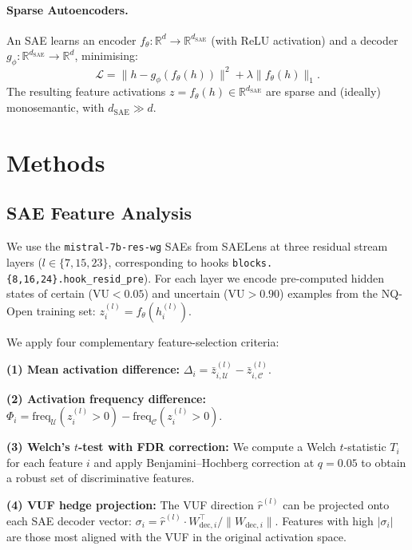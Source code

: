 \documentclass{article}
\newcommand{\VU}{\mathrm{VU}}
\begin{document}
\paragraph{Sparse Autoencoders.}
An SAE learns an encoder $f_\theta: \mathbb{R}^d \to \mathbb{R}^{d_{\mathrm{SAE}}}$
(with ReLU activation) and a decoder $g_\phi: \mathbb{R}^{d_{\mathrm{SAE}}} \to
\mathbb{R}^d$, minimising:
\begin{equation}
  \mathcal{L} = \|h - g_\phi(f_\theta(h))\|^2 + \lambda \|f_\theta(h)\|_1.
  \label{eq:sae}
\end{equation}
The resulting feature activations $z = f_\theta(h) \in \mathbb{R}^{d_{\mathrm{SAE}}}$
are sparse and (ideally) monosemantic, with $d_{\mathrm{SAE}} \gg d$.

\section{Methods}
\label{sec:methods}

\subsection{SAE Feature Analysis}

We use the \texttt{mistral-7b-res-wg} SAEs from SAELens at three residual
stream layers ($l \in \{7, 15, 23\}$, corresponding to hooks
\texttt{blocks.\{8,16,24\}.hook\_resid\_pre}).  For each layer we encode
pre-computed hidden states of certain ($\VU < 0.05$) and uncertain
($\VU > 0.90$) examples from the NQ-Open training set:
$z^{(l)}_i = f_\theta(h^{(l)}_i)$.

We apply four complementary feature-selection criteria:

\textbf{(1) Mean activation difference:} $\Delta_i = \bar{z}^{(l)}_{i,\mathcal{U}} - \bar{z}^{(l)}_{i,\mathcal{C}}$.

\textbf{(2) Activation frequency difference:} $\Phi_i = \mathrm{freq}_{\mathcal{U}}(z^{(l)}_i > 0) - \mathrm{freq}_{\mathcal{C}}(z^{(l)}_i > 0)$.

\textbf{(3) Welch's $t$-test with FDR correction:} We compute a Welch $t$-statistic
$T_i$ for each feature $i$ and apply Benjamini--Hochberg correction at $q = 0.05$
to obtain a robust set of discriminative features.

\textbf{(4) VUF hedge projection:} The VUF direction $\hat{r}^{(l)}$ can be
projected onto each SAE decoder vector:
$\sigma_i = \hat{r}^{(l)} \cdot W_{\mathrm{dec},i}^{\top} / \|W_{\mathrm{dec},i}\|$.
Features with high $|\sigma_i|$ are those most aligned with the VUF in the
original activation space.
\end{document}
